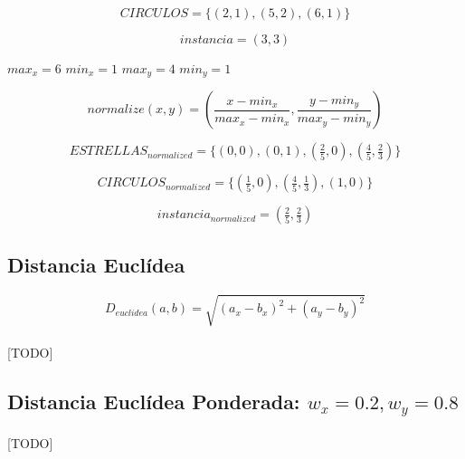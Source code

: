 \documentclass{article}
\begin{document}
		\begin{equation}
		\label{eq:circulos}
			CIRCULOS  = \{(2,1), (5,2), (6,1)\}
		\end{equation}

		\begin{equation}
		\label{eq:instancia}
			instancia  = (3,3)
		\end{equation}

		$max_x = 6$ $min_x = 1$ $max_y = 4$ $min_y = 1$


		\begin{equation}
		\label{eq:normalization}
			normalize(x,y) = (\frac{x-min_x}{max_x-min_x},\frac{y-min_y}{max_y-min_y})
		\end{equation}


		\begin{equation}
		\label{eq:estrellas_normalized}
			ESTRELLAS_{normalized} = \{(0,0), (0,1), (\tfrac{2}{5},0), (\tfrac{4}{5},\tfrac{2}{3})\}
		\end{equation}

		\begin{equation}
		\label{eq:circulos_normalized}
			CIRCULOS_{normalized}  = \{(\tfrac{1}{5},0), (\tfrac{4}{5},\tfrac{1}{3}), (1,0)\}
		\end{equation}

		\begin{equation}
		\label{eq:instancia_normalized}
			instancia_{normalized}  = (\tfrac{2}{5},\tfrac{2}{3})
		\end{equation}

		\subsection{Distancia Euclídea}


			\begin{equation}
				D_{euclidea}(a,b) = \sqrt{(a_x - b_x)^2 + (a_y - b_y)^2}
			\end{equation}


			\paragraph{}
			[TODO]



		\subsection{Distancia Euclídea Ponderada: $w_x=0.2, w_y=0.8$}

			\paragraph{}
			[TODO]
\end{document}
